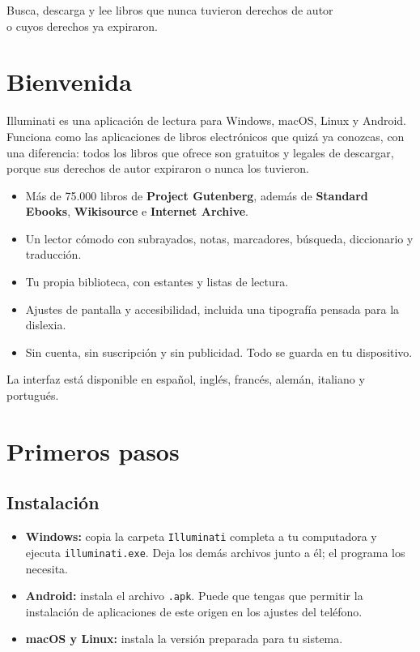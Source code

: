 \documentclass[11pt]{article}
\begin{document}
%
  {Busca, descarga y lee libros que nunca tuvieron derechos de autor\\o cuyos derechos ya expiraron.}

{\setcounter{tocdepth}{1}\tableofcontents}
\newpage

\section{Bienvenida}

Illuminati es una aplicación de lectura para Windows, macOS, Linux y Android. Funciona como las
aplicaciones de libros electrónicos que quizá ya conozcas, con una diferencia: todos los libros
que ofrece son gratuitos y legales de descargar, porque sus derechos de autor expiraron o nunca
los tuvieron.

\begin{itemize}
  \item Más de 75.000 libros de \textbf{Project Gutenberg}, además de \textbf{Standard Ebooks},
        \textbf{Wikisource} e \textbf{Internet Archive}.
  \item Un lector cómodo con subrayados, notas, marcadores, búsqueda, diccionario y traducción.
  \item Tu propia biblioteca, con estantes y listas de lectura.
  \item Ajustes de pantalla y accesibilidad, incluida una tipografía pensada para la dislexia.
  \item Sin cuenta, sin suscripción y sin publicidad. Todo se guarda en tu dispositivo.
\end{itemize}

La interfaz está disponible en español, inglés, francés, alemán, italiano y portugués.

\section{Primeros pasos}

\subsection{Instalación}
\begin{itemize}
  \item \textbf{Windows:} copia la carpeta \texttt{Illuminati} completa a tu computadora y ejecuta
        \texttt{illuminati.exe}. Deja los demás archivos junto a él; el programa los necesita.
  \item \textbf{Android:} instala el archivo \texttt{.apk}. Puede que tengas que permitir la
        instalación de aplicaciones de este origen en los ajustes del teléfono.
  \item \textbf{macOS y Linux:} instala la versión preparada para tu sistema.
\end{itemize}
\end{document}
